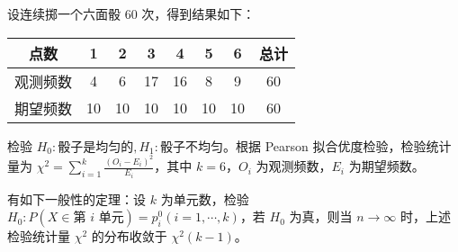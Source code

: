 \documentclass[../main.tex]{subfiles}
\begin{document}
\begin{example}
    设连续掷一个六面骰 $60$ 次，得到结果如下：

    \bigskip
    \begin{tabular}{|c|c|c|c|c|c|c|c|}
        \hline
        点数     & 1  & 2  & 3  & 4  & 5  & 6  & 总计 \\
        \hline
        观测频数 & 4  & 6  & 17 & 16 & 8  & 9  & 60   \\
        \hline
        期望频数 & 10 & 10 & 10 & 10 & 10 & 10 & 60   \\
        \hline
    \end{tabular}
    \bigskip

    检验 $H_0:\text{骰子是均匀的},H_1:\text{骰子不均匀}$。根据 Pearson 拟合优度检验，检验统计量为 $\chi^2=\sum_{i=1}^k\frac{(O_i-E_i)^2}{E_i}$，其中 $k=6$，$O_i$ 为观测频数，$E_i$ 为期望频数。

    有如下一般性的定理：设 $k$ 为单元数，检验 $H_0:P(X\in\text{第 $i$ 单元})=p_i^0(i=1,\cdots,k)$，若 $H_0$ 为真，则当 $n\rightarrow\infty$ 时，上述检验统计量 $\chi^2$ 的分布收敛于 $\chi^2(k-1)$。
\end{example}
\end{document}
